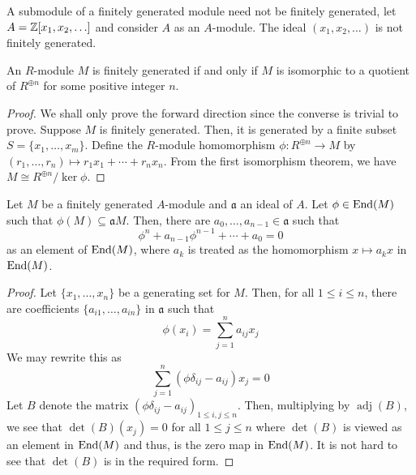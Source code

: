 A submodule of a finitely generated module need not be finitely generated, let $A = \mathbb{Z}[x_1,x_2,\ldots]$ and consider $A$ as an $A$-module. The ideal $(x_1,x_2,\ldots)$ is not finitely generated.

\begin{proposition}
    An $R$-module $M$ is finitely generated if and only if $M$ is isomorphic to a quotient of $R^{\oplus n}$ for some positive integer $n$.
\end{proposition}
\begin{proof}
    We shall only prove the forward direction since the converse is trivial to prove. Suppose $M$ is finitely generated. Then, it is generated by a finite subset $S = \{x_1,\ldots,x_m\}$. Define the $R$-module homomorphism $\phi:R^{\oplus n}\to M$ by $(r_1,\ldots,r_n)\mapsto r_1x_1 + \cdots + r_nx_n$. From the first isomorphism theorem, we have $M\cong R^{\oplus n}/\ker\phi$.
\end{proof}

\begin{proposition}
    Let $M$ be a finitely generated $A$-module and $\mathfrak a$ an ideal of $A$. Let $\phi\in\operatorname{End}(M)$ such that $\phi(M)\subseteq\mathfrak aM$. Then, there are $a_0,\ldots,a_{n - 1}\in\mathfrak a$ such that 
    \begin{equation*}
        \phi^n + a_{n - 1}\phi^{n - 1} + \cdots + a_0 = 0
    \end{equation*}
    as an element of $\operatorname{End}(M)$, where $a_k$ is treated as the homomorphism $x\mapsto a_kx$ in $\operatorname{End}(M)$.
\end{proposition}
\begin{proof}
    Let $\{x_1,\ldots,x_n\}$ be a generating set for $M$. Then, for all $1\le i\le n$, there are coefficients $\{a_{i1},\ldots,a_{in}\}$ in $\mathfrak a$ such that 
    \begin{equation*}
        \phi(x_i) = \sum_{j = 1}^n a_{ij}x_j
    \end{equation*}
    We may rewrite this as 
    \begin{equation*}
        \sum_{j = 1}^n(\phi\delta_{ij} - a_{ij})x_j = 0
    \end{equation*}
    Let $B$ denote the matrix $(\phi\delta_{ij} - a_{ij})_{1\le i,j\le n}$. Then, multiplying by $\operatorname{adj}(B)$, we see that $\det(B)(x_j) = 0$ for all $1\le j\le n$ where $\det(B)$ is viewed as an element in $\operatorname{End}(M)$ and thus, is the zero map in $\operatorname{End}(M)$. It is not hard to see that $\det(B)$ is in the required form.
\end{proof}

